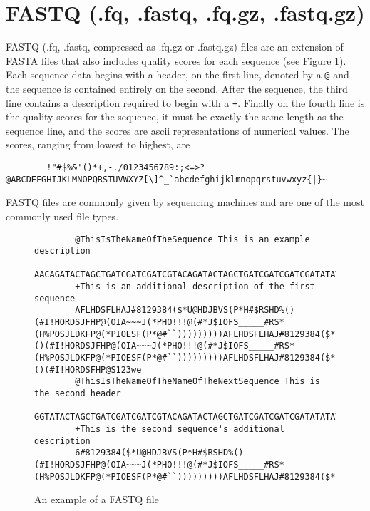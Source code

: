 \documentclass[a4]{article}
\begin{document}
\section{FASTQ (.fq, .fastq, .fq.gz, .fastq.gz)}
	FASTQ (.fq, .fastq, compressed as .fq.gz or .fastq.gz) files are an extension of FASTA files that also includes quality scores for each sequence (see Figure \ref{fastq}). Each sequence data begins with a header, on the first line, denoted by a \verb|@| and the sequence is contained entirely on the second. After the sequence, the third line contains a description required to begin with a \verb|+|. Finally on the fourth line is the quality scores for the sequence, it must be exactly the same length as the sequence line, and the scores are ascii representations of numerical values. The scores, ranging from lowest to highest, are  
	\begin{lstlisting}
		!"#$%&'()*+,-./0123456789:;<=>?@ABCDEFGHIJKLMNOPQRSTUVWXYZ[\]^_`abcdefghijklmnopqrstuvwxyz{|}~
	\end{lstlisting}
	FASTQ files are commonly given by sequencing machines and are one of the most commonly used file types. 
	\begin{figure}[h]
		\begin{lstlisting}
		@ThisIsTheNameOfTheSequence This is an example description
		AACAGATACTAGCTGATCGATCGATCGTACAGATACTAGCTGATCGATCGATCGATATATATATGCCGCGATACGTACGTGGTATACTAGCTGATCGATCGATCGTACAGATACTAGCTGATCGATCGATCGATATATATATGCCGCGATACGTACGTAAAACAGATACTAGCTGATCGATCGATCGTACAGATACTAGCTGATCGATCGATCGATATATATATGCCGCGATACGTACGTGGTATACTAGCTGATCGATCGATCGTACAGATACTAGCTGATCGATCGATCGATATATATATGCCGCGATACGTACGTAA
		+This is an additional description of the first sequence
		AFLHDSFLHAJ#8129384($*U@HDJBVS(P*H#$RSHD%()(#I!HORDSJFHP@(OIA~~~J(*PHO!!!@(#*J$IOFS_____#RS*(H%POSJLDKFP@(*PIOESF(P*@#``)))))))))AFLHDSFLHAJ#8129384($*U@HDJBVS(P*H#$RSHD%()(#I!HORDSJFHP@(OIA~~~J(*PHO!!!@(#*J$IOFS_____#RS*(H%POSJLDKFP@(*PIOESF(P*@#``)))))))))AFLHDSFLHAJ#8129384($*U@HDJBVS(P*H#$RSHD%()(#I!HORDSFHP@S123we
		@ThisIsTheNameOfTheNameOfTheNextSequence This is the second header
		GGTATACTAGCTGATCGATCGATCGTACAGATACTAGCTGATCGATCGATCGATATATATATGCCGCGATACGTACGTAAAACAGATACTAGCTGATCGATCGATCGTACAGATACTAGCTGATCGATCGATCGATATATATATGCCGCGATACGTACGT
		+This is the second sequence's additional description
		6#8129384($*U@HDJBVS(P*H#$RSHD%()(#I!HORDSJFHP@(OIA~~~J(*PHO!!!@(#*J$IOFS_____#RS*(H%POSJLDKFP@(*PIOESF(P*@#``)))))))))AFLHDSFLHAJ#8129384($*U@HDJBVS(P*H#$RSH
		\end{lstlisting}
		\caption{An example of a FASTQ file}\label{fastq}
	\end{figure}
	
\end{document}
